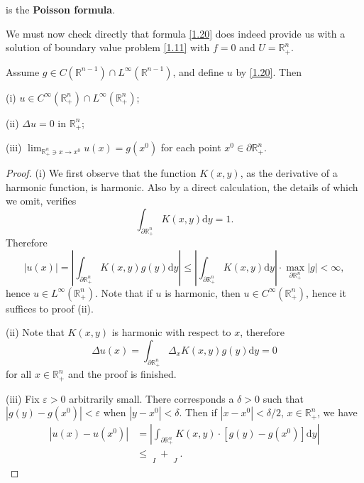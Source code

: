 is the \textbf{Poisson formula}.\par
We must now check directly that formula \eqref{1.20} does indeed provide us with a solution of boundary value problem \eqref{1.11} with $f=0$ and $U=\mathbb{R}_+^n$.
\begin{theorem}\label{Thm1.2.20}
Assume $g\in C(\mathbb{R}^{n-1})\cap L^\infty(\mathbb{R}^{n-1})$, and define $u$ by \eqref{1.20}. Then \par
(i) $u\in C^\infty(\mathbb{R}_+^n)\cap L^\infty(\mathbb{R}_+^n)$;\par
(ii) $\Delta u=0$ in $\mathbb{R}_+^n$;\par
(iii) $\lim_{\mathbb{R} _{+}^{n}\ni x\rightarrow x^0} u( x ) =g\left( x^0 \right) $ for each point $x^0\in\partial\mathbb{R}_+^n$.
\end{theorem}
\begin{proof}
(i) We first observe that the function $K(x,y)$, as the derivative of a harmonic function, is harmonic. Also by a direct calculation, the details of which we omit, verifies 
$$
\int_{\partial \mathbb{R} _{+}^{n}}{K\left( x,y \right) \mathrm{d}y}=1.
$$
Therefore 
$$
\left| u\left( x \right) \right|=\left| \int_{\partial \mathbb{R} _{+}^{n}}{K\left( x,y \right) g\left( y \right) \mathrm{d}y} \right|\le \left| \int_{\partial \mathbb{R} _{+}^{n}}{K\left( x,y \right) \mathrm{d}y} \right|\cdot \max_{\partial \mathbb{R} _{+}^{n}} \left| g \right|<\infty ,
$$
hence $u\in L^\infty(\mathbb{R}_+^n)$. Note that if $u$ is harmonic, then $u\in C^\infty(\mathbb{R}_+^n)$, hence it suffices to proof (ii).\par
(ii) Note that $K(x,y)$ is harmonic with respect to $x$, therefore 
$$
\Delta u\left( x \right) =\int_{\partial \mathbb{R} _{+}^{n}}{\Delta _xK\left( x,y \right) g\left( y \right) \mathrm{d}y}=0
$$
for all $x\in\mathbb{R}_+^n$ and the proof is finished.\par
(iii) Fix $\varepsilon>0$ arbitrarily small. There corresponds a $\delta>0$ such that $|g(y)-g(x^0)|<\varepsilon$ when $|y-x^0|<\delta$. Then if $|x-x^0|<\delta/2$, $x\in\mathbb{R}_+^n$, we have 
$$
\begin{aligned}
\left| u\left( x \right) -u\left( x^0 \right) \right|&=\left| \int_{\partial \mathbb{R} _{+}^{n}}{K\left( x,y \right) \cdot \left[ g\left( y \right) -g\left( x^0 \right) \right] \mathrm{d}y} \right|
\\
&\le \mathop {\underbrace{\int_{\partial \mathbb{R} _{+}^{n}\cap B\left( x^0,\delta \right)}{K\left( x,y \right) \cdot \left| g\left( y \right) -g\left( x^0 \right) \right|\mathrm{d}y}}} \limits_{I}+\mathop {\underbrace{\int_{\partial \mathbb{R} _{+}^{n}\setminus B\left( x_0,\delta \right)}{K\left( x,y \right) \cdot \left| g\left( y \right) -g\left( x^0 \right) \right|\mathrm{d}y}}} \limits_{J}.

\end{aligned}$$
\end{proof}
